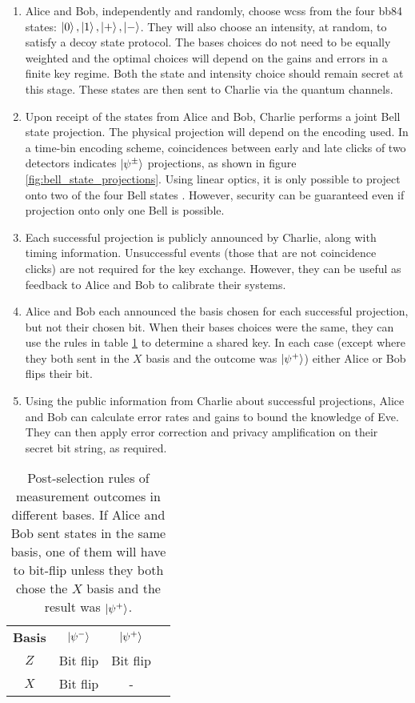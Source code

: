 \begin{enumerate}
	\item {} Alice and Bob, independently and randomly, choose \acp{wcs} from the four \ac{bb84} states: $\ket{0}, \ket{1}, \ket{+}, \ket{-}$. They will also choose an intensity, at random, to satisfy a decoy state protocol. The bases choices do not need to be equally weighted and the optimal choices will depend on the gains and errors in a finite key regime. Both the state and intensity choice should remain secret at this stage. These states are then sent to Charlie via the quantum channels. 
	\item {} Upon receipt of the states from Alice and Bob, Charlie performs a joint Bell state projection. The physical projection will depend on the encoding used. In a time-bin encoding scheme, coincidences between early and late clicks of two detectors indicates $\ket{\psi^\pm}$ projections, as shown in figure \ref{fig:bell_state_projections}. Using linear optics, it is only possible to project onto two of the four Bell states \cite{walborn2003, Mattle1996}. However, security can be guaranteed even if projection onto only one Bell is possible.
	\item {} Each successful projection is publicly announced by Charlie, along with timing information. Unsuccessful events (those that are not coincidence clicks) are not required for the key exchange. However, they can be useful as feedback to Alice and Bob to calibrate their systems.
	\item {} Alice and Bob each announced the basis chosen for each successful projection, but not their chosen bit. When their bases choices were the same, they can use the rules in table \ref{tab:mdi-outcomes} to determine a shared key. In each case (except where they both sent in the $X$ basis and the outcome was $\ket{\psi^+}$) either Alice or Bob flips their bit. 
	\item {} Using the public information from Charlie about successful projections, Alice and Bob can calculate error rates and gains to bound the knowledge of Eve. They can then  apply error correction and privacy amplification on their secret bit string, as required.
\end{enumerate}

\begin{table}[t]
\centering
\begin{tabular}{@{}cccc@{}}
\textbf{Basis}      & $\ket{\psi^-}$     & $\ket{\psi^+}$        \\
$Z$              & Bit flip           & Bit flip                \\
$X$              & Bit flip           & \multicolumn{1}{c}{-}   \\
\end{tabular}
\caption[Measurement outcomes in MDI-QKD]{Post-selection rules of measurement outcomes in different bases. If Alice and Bob sent states in the same basis, one of them will have to bit-flip unless they both chose the $X$ basis and the result was $\ket{\psi^+}$.}
\label{tab:mdi-outcomes}
\end{table}

